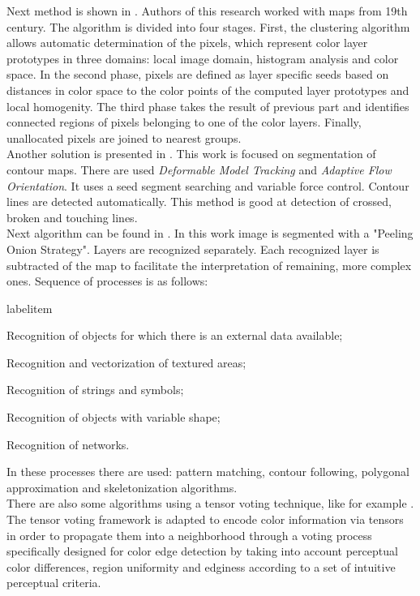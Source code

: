 \documentclass[a4paper,onecolumn,oneside,12pt]{memoir}
\makeatletter
\renewenvironment{itemize}{
  \begin{list}{  
  \csname labelitem\romannumeral\the\@listdepth\endcsname}{
  \setlength{\leftmargin}{1em}
	\setlength{\topsep}{6pt}%
	\setlength{\partopsep}{0pt}%
	\setlength{\parskip}{0pt}%
	\setlength{\parsep}{0pt}%
	\setlength{\itemsep}{0pt}}
}{
  \end{list}
}
\makeatother
\begin{document}
Next method is shown in \cite{colorsOfThePast}. Authors of this research worked with maps from 
19th century. The algorithm is divided into four stages. First, the clustering algorithm allows 
automatic determination of the pixels, which represent color layer prototypes in three domains:
local image domain, histogram analysis and color space. In the second phase, pixels are defined as
layer specific seeds based on distances in color space to the color points of the computed layer 
prototypes and local homogenity. The third phase takes the result of previous part and identifies 
connected regions of pixels belonging to one of the color layers. Finally, unallocated pixels are
joined to nearest groups. \\

Another solution is presented in \cite{automaticVectorization}. This work is focused on segmentation
of contour maps. There are used \textit{Deformable Model Tracking} and \textit{Adaptive Flow 
Orientation}. It uses a seed segment searching and variable force control. Contour lines are 
detected automatically. This method is good at detection of crossed, broken and touching lines. \\

Next algorithm can be found in \cite{topographicMapsAutomaticVectorization}. In this work image is
segmented with a "Peeling Onion Strategy". Layers are recognized separately. Each recognized layer
is subtracted of the map to facilitate the interpretation of remaining, more complex ones. Sequence
of processes is as follows:

\begin{itemize}
  \item Recognition of objects for which there is an external data available;
  \item Recognition and vectorization of textured areas;
  \item Recognition of strings and symbols;
  \item Recognition of objects with variable shape;
  \item Recognition of networks.
\end{itemize}

In these processes there are used: pattern matching, contour following, polygonal approximation and
skeletonization algorithms. \\

There are also some algorithms using a tensor voting technique, like for example
\cite{tensorVoting}. The tensor voting framework is adapted to encode color information via tensors
in order to propagate them into a neighborhood through a voting process specifically designed for
color edge detection by taking into account perceptual color differences, region uniformity and
edginess according to a set of intuitive perceptual criteria. \\
\end{document}
